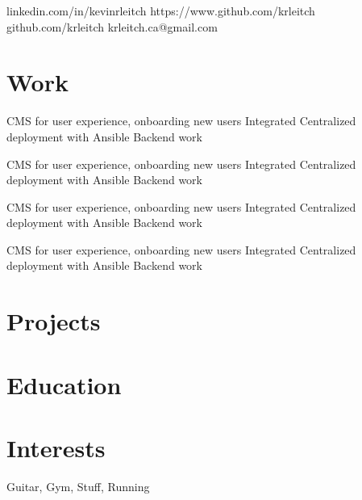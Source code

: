 \documentclass{my_resume}
\begin{document}
        {linkedin.com/in/kevinrleitch}
        {https://www.github.com/krleitch}
        {github.com/krleitch}
        {krleitch.ca@gmail.com}

\section{Work}

\workitems
{CMS for user experience, onboarding new users}
{Integrated Centralized deployment with Ansible}
{Backend work}

\workitems
{CMS for user experience, onboarding new users}
{Integrated Centralized deployment with Ansible}
{Backend work}

\workitems
{CMS for user experience, onboarding new users}
{Integrated Centralized deployment with Ansible}
{Backend work}

\workitems
{CMS for user experience, onboarding new users}
{Integrated Centralized deployment with Ansible}
{Backend work}

\section{Projects}

\section{Education}

\section{Interests}
Guitar, Gym, Stuff, Running
\end{document}
